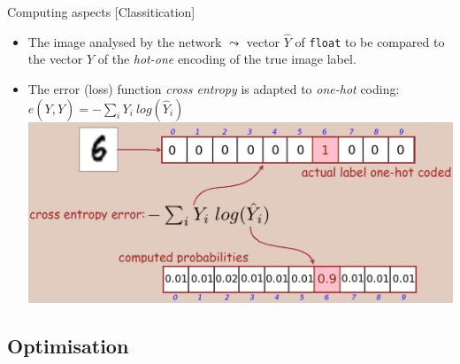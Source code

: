 \documentclass[10pt,serif,mathserif,compress,hyperref={colorlinks}]{beamer}
\begin{document}
\begin{frame}{Computing aspects [Classitication]}

\begin{tcolorbox}[title=Error function: {\em Cross entropy error}]

  \begin{itemize}
  \item The image analysed by the network $\leadsto$ vector $\hat{Y}$ of \texttt{float} to be compared to the vector $Y$ of the {\em hot-one} encoding of the true image label.
  \item The error (loss) function {\em cross entropy} is adapted to {\em one-hot} coding: $e(Y,\hat{Y})=-\sum_i Y_i\ log(\hat {Y}_i)$\\
    \includegraphics[width=.9\textwidth]{images/CrossEntropyError.png}
  \end{itemize}
  
   \end{tcolorbox}  
\end{frame}

\subsection{Optimisation}
\end{document}

